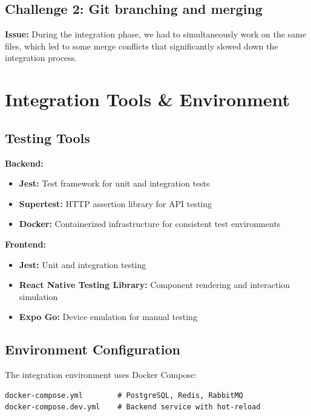 \subsection{Challenge 2: Git branching and merging}
\label{subsec:challenge_git_merging}

\textbf{Issue:} During the integration phase, we had to simultaneously work on the same files, which led to some merge conflicts that significantly slowed down the integration process.

\section{Integration Tools \& Environment}
\label{sec:integration_tools}

\subsection{Testing Tools}
\label{subsec:testing_tools}

\textbf{Backend:}
\begin{itemize}
    \item \textbf{Jest:} Test framework for unit and integration tests
    \item \textbf{Supertest:} HTTP assertion library for API testing
    \item \textbf{Docker:} Containerized infrastructure for consistent test environments
\end{itemize}

\textbf{Frontend:}
\begin{itemize}
    \item \textbf{Jest:} Unit and integration testing
    \item \textbf{React Native Testing Library:} Component rendering and interaction simulation
    \item \textbf{Expo Go:} Device emulation for manual testing
\end{itemize}

\subsection{Environment Configuration}
\label{subsec:environment_config}

The integration environment uses Docker Compose:

\begin{verbatim}
docker-compose.yml        # PostgreSQL, Redis, RabbitMQ
docker-compose.dev.yml    # Backend service with hot-reload
\end{verbatim}

